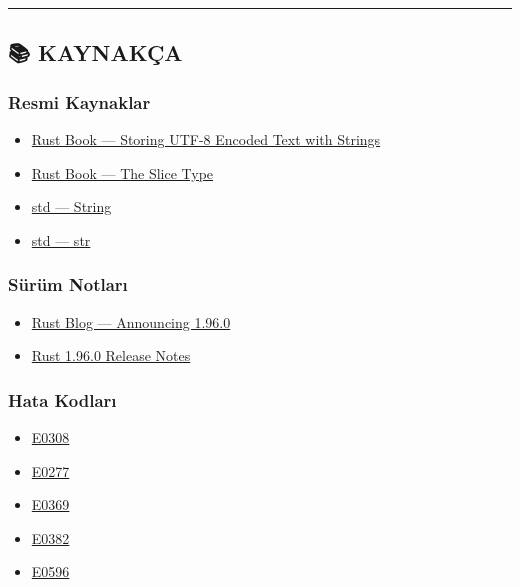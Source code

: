 \documentclass[12pt,a4paper]{article}
\begin{document}
\begin{center}\rule{0.5\linewidth}{0.5pt}\end{center}

\subsection{📚 KAYNAKÇA}\label{kaynakça-5}

\subsubsection{Resmi Kaynaklar}\label{resmi-kaynaklar-5}

\begin{itemize}
\tightlist
\item
  \href{https://doc.rust-lang.org/book/ch08-02-strings.html}{Rust Book --- Storing UTF-8 Encoded Text with Strings}
\item
  \href{https://doc.rust-lang.org/book/ch04-03-slices.html}{Rust Book --- The Slice Type}
\item
  \href{https://doc.rust-lang.org/std/string/struct.String.html}{std --- String}
\item
  \href{https://doc.rust-lang.org/std/primitive.str.html}{std --- str}
\end{itemize}

\subsubsection{Sürüm Notları}\label{sürüm-notları-5}

\begin{itemize}
\tightlist
\item
  \href{https://blog.rust-lang.org/2026/05/28/Rust-1.96.0/}{Rust Blog --- Announcing 1.96.0}
\item
  \href{https://doc.rust-lang.org/stable/releases.html\#version-1960-2026-05-28}{Rust 1.96.0 Release Notes}
\end{itemize}

\subsubsection{Hata Kodları}\label{hata-kodları-5}

\begin{itemize}
\tightlist
\item
  \href{https://doc.rust-lang.org/error_codes/E0308.html}{E0308}
\item
  \href{https://doc.rust-lang.org/error_codes/E0277.html}{E0277}
\item
  \href{https://doc.rust-lang.org/error_codes/E0369.html}{E0369}
\item
  \href{https://doc.rust-lang.org/error_codes/E0382.html}{E0382}
\item
  \href{https://doc.rust-lang.org/error_codes/E0596.html}{E0596}
\end{itemize}
\end{document}
